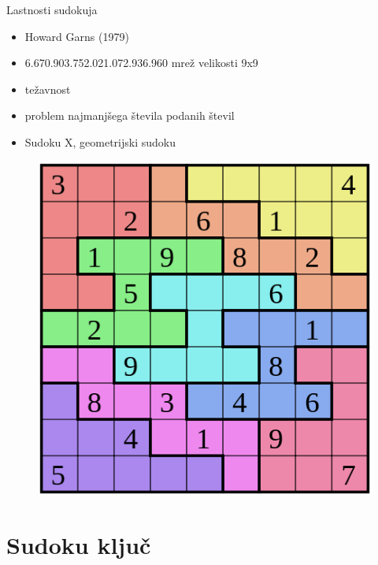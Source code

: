 \documentclass{beamer}
\begin{document}
\begin{frame}{Lastnosti sudokuja}

\begin{itemize}
\item Howard Garns (1979)
\item 6.670.903.752.021.072.936.960 mrež velikosti 9x9
\item težavnost
\item problem najmanjšega števila podanih števil
\item Sudoku X, geometrijski sudoku
\end{itemize}

\begin{figure}
\centering
\includegraphics[scale=0.23]{geo_sudoku}
\end{figure}

\end{frame}


\section{Sudoku ključ}

\end{document}
